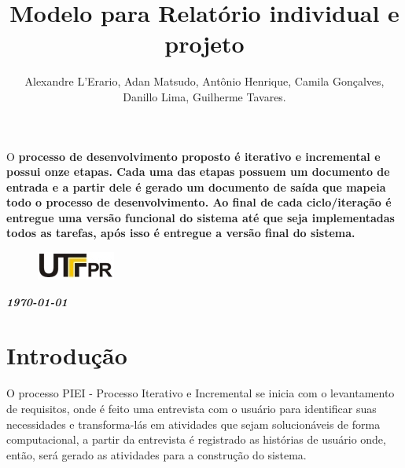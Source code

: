 \documentclass[	DIV=calc,%
							paper=a4,%
							fontsize=12pt,%
							onecolumn]{scrartcl}	 					%
\title{Modelo para Relatório individual e projeto}					%
\author{Alexandre L'Erario, Adan Matsudo, Antônio Henrique, Camila Gonçalves, Danillo Lima, Guilherme Tavares.}  	%
\date{}																				%
\newcommand{\initial}[1]{%
     \lettrine[lines=3,lhang=0.3,nindent=0em]{
     				\color{DarkGoldenrod}
     				{\textsf{#1}}}{}}
\begin{document}
\maketitle
\thispagestyle{fancy} 	
\thispagestyle{empty}		%




\initial{O}\textbf{ processo de desenvolvimento proposto é iterativo e incremental e possui onze etapas. Cada uma das etapas possuem um documento de entrada e a partir dele é gerado um documento de saída que mapeia todo o processo de desenvolvimento. Ao final de cada ciclo/iteração é entregue uma versão funcional do sistema até que seja implementadas todos as tarefas, após isso é entregue a versão final do sistema.}

\begin{figure}
	\centering
	\includegraphics{utfpr}
\end{figure}

\vspace{3cm}
\centerline{\textit{\textbf{\today}}}

\clearpage
    \renewcommand*\listfigurename{Lista de figuras}
\listoffigures

\renewcommand*\listtablename{Lista de tabelas}
\listoftables




\clearpage
\renewcommand{\contentsname}{Sumário}
\tableofcontents
\clearpage

\section{Introdução}
 O processo PIEI - Processo Iterativo e Incremental se inicia com o levantamento de requisitos, onde é feito uma entrevista com o usuário para identificar suas necessidades e transforma-lás em atividades que sejam solucionáveis de forma computacional, a partir da entrevista é registrado as histórias de usuário onde, então, será gerado as atividades para a construção do sistema. 
 
\end{document}
